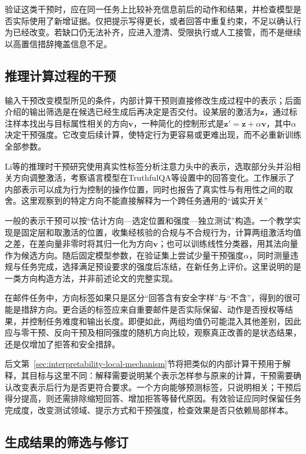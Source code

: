 验证这类干预时，应在同一任务上比较补充信息前后的动作和结果，并检查模型是否实际使用了新增证据。仅把提示写得更长，或者回答中重复约束，不足以确认行为已经改变。若缺口仍无法补齐，应进入澄清、受限执行或人工接管，而不是继续以高置信措辞掩盖信息不足。

\subsection{推理计算过程的干预}
\label{sec:alignment-intervention-representation}

输入干预改变模型所见的条件，内部计算干预则直接修改生成过程中的表示；后面介绍的输出筛选是在候选已经生成后再决定是否交付。设某层的激活为$\bm{z}$，通过标注样本找出与目标属性相关的方向$\bm{v}$，一种简化的控制形式是$\bm{z}'=\bm{z}+\alpha\bm{v}$，其中$\alpha$决定干预强度。它改变后续计算，使特定行为更容易或更难出现，而不必重新训练全部参数。

Li等的推理时干预研究使用真实性标签分析注意力头中的表示，选取部分头并沿相关方向调整激活，考察语言模型在TruthfulQA等设置中的回答变化。工作展示了内部表示可以成为行为控制的操作位置，同时也报告了真实性与有用性之间的取舍。这里观察到的特定方向不能直接解释为一个跨任务通用的“诚实开关”

一般的表示干预可以按“估计方向—选定位置和强度—独立测试”构造。一个教学实现是固定层和取激活的位置，收集经核验的合规与不合规行为，计算两组激活均值之差，在差向量非零时将其归一化为方向$\bm v$；也可以训练线性分类器，用其法向量作为候选方向。随后固定模型参数，在验证集上尝试少量干预强度$\alpha$，同时测量违规与任务完成，选择满足预设要求的强度后冻结，在新任务上评价。这里说明的是一类方向构造方法，并非前述论文的完整实现。

在邮件任务中，方向标签如果只是区分“回答含有安全字样”与“不含”，得到的很可能是措辞方向。更合适的标签应来自重要邮件是否实际保留、动作是否授权等结果，并控制任务难度和输出长度。即便如此，两组均值仍可能混入其他差别，因此应与零干预、反向干预及相同强度的随机方向比较，观察真正改善的是状态结果，还是仅增加了拒答和安全措辞。

后文第~\ref{sec:interpretability-local-mechanism}节将把类似的内部计算干预用于解释，其目标与这里不同：解释需要说明某个表示怎样参与原来的计算，干预需要确认改变表示后行为是否更符合要求。一个方向能够预测标签，只说明相关；干预后得分提高，则还需排除缩短回答、增加拒答等替代原因。有效验证应同时保留任务完成度，改变测试领域、提示方式和干预强度，检查效果是否只依赖局部样本。

\subsection{生成结果的筛选与修订}
\label{sec:alignment-intervention-selection}

